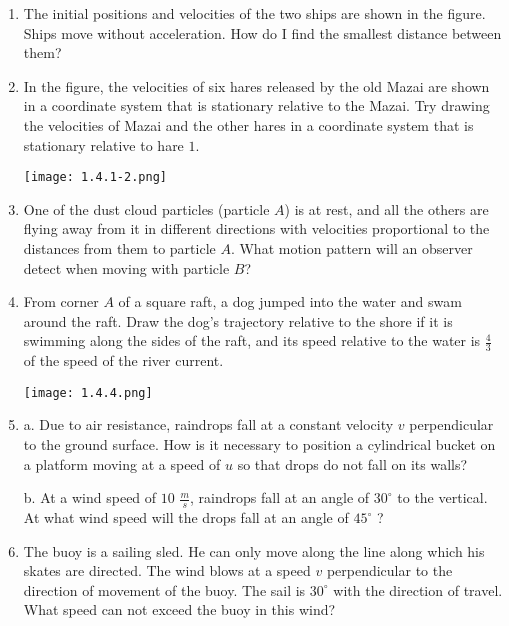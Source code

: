 \documentclass{article}
\begin{document}
\begin{enumerate}[label=1.4.\arabic*]

\item The initial positions and velocities of the two ships are shown in the figure. Ships move without acceleration. How do I find the smallest distance between them?

\item In the figure, the velocities of six hares released by the old Mazai are shown in a coordinate system that is stationary relative to the Mazai. Try drawing the velocities of Mazai and the other hares in a coordinate system that is stationary relative to hare $1$.

\begin{center}
    \texttt{[image: 1.4.1-2.png]}
\end{center}

\item One of the dust cloud particles (particle $A$) is at rest, and all the others are flying away from it in different directions with velocities proportional to the distances from them to particle $A$. What motion pattern will an observer detect when moving with particle $B$?

\item From corner $A$ of a square raft, a dog jumped into the water and swam around the raft. Draw the dog's trajectory relative to the shore if it is swimming along the sides of the raft, and its speed relative to the water is $\frac{4}{3}$ of the speed of the river current.

\begin{center}
    \texttt{[image: 1.4.4.png]}
\end{center}

\item a. Due to air resistance, raindrops fall at a constant velocity $v$ perpendicular to the ground surface. How is it necessary to position a cylindrical bucket on a platform moving at a speed of $u$ so that drops do not fall on its walls? 

b. At a wind speed of $10$ $\frac{m}{s}$, raindrops fall at an angle of $30^\circ$ to the vertical. At what wind speed will the drops fall at an angle of $45^\circ$ ?

\item The buoy is a sailing sled. He can only move along the line along which his skates are directed. The wind blows at a speed $v$ perpendicular to the direction of movement of the buoy. The sail is $30^\circ$ with the direction of travel. What speed can not exceed the buoy in this wind?


\end{enumerate}
\end{document}
